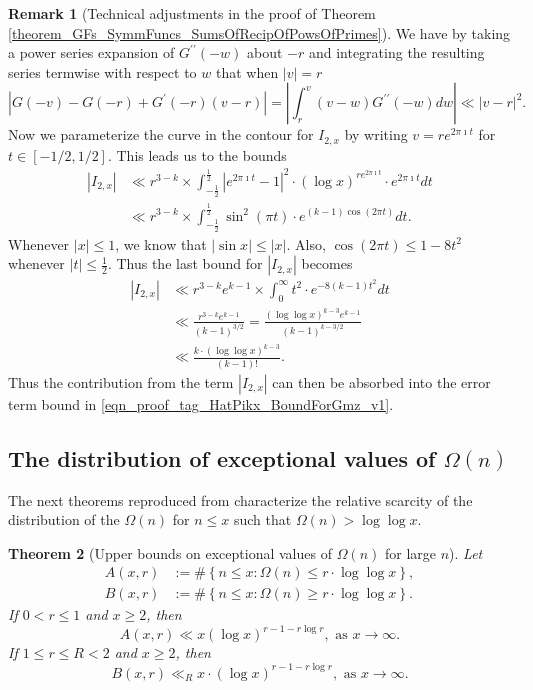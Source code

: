 \documentclass[11pt,reqno,a4letter]{article}
\numberwithin{figure}{section}
\numberwithin{table}{section}
\theoremstyle{plain}
\newtheorem{theorem}{Theorem}
\numberwithin{theorem}{section}
\theoremstyle{definition}
\newtheorem{remark}[theorem]{Remark}
\begin{document}
\begin{remark}[Technical adjustments in the proof of Theorem \ref{theorem_GFs_SymmFuncs_SumsOfRecipOfPowsOfPrimes}]
We have by taking a power series expansion of $G^{\prime\prime}(-w)$ about $-r$ and integrating 
the resulting series termwise with respect to $w$ that when $|v| = r$ 
\[
\left\lvert G(-v) - G(-r) + G^{\prime}(-r) (v-r) \right\rvert = 
     \left\lvert \int_{r}^{v} (v-w) G^{\prime\prime}(-w) dw \right\rvert \ll |v-r|^2. 
\] 
Now we parameterize the curve in the contour for $I_{2,x}$ by writing 
$v = re^{2\pi\imath t}$ for $t \in [-1/2, 1/2]$. This leads us to the bounds 
\begin{align*} 
|I_{2,x}| & \ll r^{3-k} \times \int_{-\frac{1}{2}}^{\frac{1}{2}} |e^{2\pi\imath t} - 1|^2 \cdot 
     (\log x)^{r e^{2\pi\imath t}} \cdot e^{2\pi\imath t} dt \\ 
     & \ll r^{3-k} \times \int_{-\frac{1}{2}}^{\frac{1}{2}} \sin^2(\pi t) \cdot 
     e^{(k-1) \cos(2\pi t)} dt. 
\end{align*} 
Whenever $|x| \leq 1$, we know that $|\sin x| \leq |x|$. 
Also, $\cos(2\pi t) \leq 1 - 8t^2$ whenever $|t| \leq \frac{1}{2}$. 
Thus the last bound for $|I_{2,x}|$ becomes 
\begin{align*} 
|I_{2,x}| & \ll r^{3-k} e^{k-1} \times \int_0^{\infty} t^2 \cdot e^{-8(k-1)t^2} dt \\ 
     & \ll \frac{r^{3-k} e^{k-1}}{(k-1)^{3/2}} = \frac{(\log\log x)^{k-3} e^{k-1}}{(k-1)^{k-3/2}} \\ 
     & \ll \frac{k \cdot (\log\log x)^{k-3}}{(k-1)!}. 
\end{align*} 
Thus the contribution from the term $|I_{2,x}|$ can then be absorbed into the error term bound 
in \eqref{eqn_proof_tag_HatPikx_BoundForGmz_v1}. 
\end{remark} 

\subsection{The distribution of exceptional values of $\Omega(n)$} 

The next theorems reproduced from \cite[\S 7.4]{MV} characterize the relative 
scarcity of the distribution of the $\Omega(n)$ for $n \leq x$ such that 
$\Omega(n) > \log\log x$. 

\begin{theorem}[Upper bounds on exceptional values of $\Omega(n)$ for large $n$] 
\label{theorem_MV_Thm7.20-init_stmt} 
Let 
\begin{align*} 
A(x, r) & := \#\left\{n \leq x: \Omega(n) \leq r \cdot \log\log x\right\}, \\ 
B(x, r) & := \#\left\{n \leq x: \Omega(n) \geq r \cdot \log\log x\right\}. 
\end{align*} 
If $0 < r \leq 1$ and $x \geq 2$, then 
\[
A(x, r) \ll x (\log x)^{r-1 - r\log r}, \text{ \ as\ } x \rightarrow \infty. 
\]
If $1 \leq r \leq R < 2$ and $x \geq 2$, then 
\[
B(x, r) \ll_R x \cdot (\log x)^{r-1-r \log r}, \text{ \ as\ } x \rightarrow \infty. 
\]
\end{theorem} 
\end{document}
